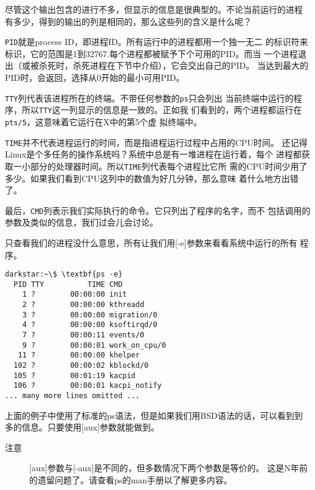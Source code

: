 尽管这个输出包含的进行不多，但显示的信息是很典型的。不论当前运行的进程
有多少，得到的输出的列是相同的，那么这些列的含义是什么呢？

\texttt{PID}就是process ID，即进程ID。所有运行中的进程都用一个独一无二
的标识符来标识，它的范围是1到32767.每个进程都被赋予下个可用的PID。而当
一个进程退出（或被杀死时，杀死进程在下节中介绍），它会交出自己的PID。
当达到最大的PID时，会返回，选择从0开始的最小可用PID。

\texttt{TTY}列代表该进程所在的终端。不带任何参数的\texttt{ps}只会列出
当前终端中运行的程序，所以\texttt{TTY}这一列显示的信息是一致的。正如我
们看到的，两个进程都运行在\texttt{pts/5}，这意味着它运行在X中的第5个虚
拟终端中。

\texttt{TIME}并不代表进程运行的时间，而是指进程运行过程中占用的CPU时间。
还记得Linux是个多任务的操作系统吗？系统中总是有一堆进程在运行着，每个
进程都获取一小部分的处理器时间。所以\texttt{TIME}列代表每个进程比它所
需的CPU时间少用了多少。如果我们看到CPU这列中的数值为好几分钟，那么意味
着什么地方出错了。

最后，\texttt{CMD}列表示我们实际执行的命令。它只列出了程序的名字，而不
包括调用的参数及类似的信息，我们过会儿会讨论。

只查看我们的进程没什么意思，所有让我们用[-e]参数来看看系统中运行的所有
程序。
\begin{Verbatim}[frame=single, commandchars=\\\{\}]
darkstar:~\$ \textbf{ps -e}
  PID TTY          TIME CMD
    1 ?        00:00:00 init
    2 ?        00:00:00 kthreadd
    3 ?        00:00:00 migration/0
    4 ?        00:00:00 ksoftirqd/0
    7 ?        00:00:11 events/0
    9 ?        00:00:01 work_on_cpu/0
   11 ?        00:00:00 khelper
  102 ?        00:00:02 kblockd/0
  105 ?        00:01:19 kacpid
  106 ?        00:00:01 kacpi_notify
... many more lines omitted ...
\end{Verbatim}

上面的例子中使用了标准的ps语法，但是如果我们用BSD语法的话，可以看到到
多的信息。只要使用[aux]参数就能做到。

\begin{description}
\item[注意] [aux]参数与[-aux]是不同的，但多数情况下两个参数是等价的。
  这是N年前的遗留问题了。请查看ps的man手册以了解更多内容。
\end{description}

